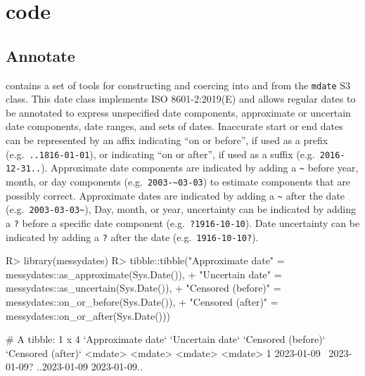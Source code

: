 \documentclass[
]{jss}
\begin{document}
\section[R code]{ code}\label{r-code}

\hypertarget{annotate}{%
\subsection{Annotate}\label{annotate}}

 contains a set of tools for constructing and coercing
into and from the \texttt{mdate} S3 class. This date class implements
ISO 8601-2:2019(E) and allows regular dates to be annotated to express
unspecified date components, approximate or uncertain date components,
date ranges, and sets of dates. Inaccurate start or end dates can be
represented by an affix indicating ``on or before'', if used as a prefix
(e.g.~\texttt{..1816-01-01}), or indicating ``on or after'', if used as
a suffix (e.g.~\texttt{2016-12-31..}). Approximate date components are
indicated by adding a \texttt{\textasciitilde{}} before year, month, or
day components (e.g.~\texttt{2003-\textasciitilde{}03-03}) to estimate
components that are possibly correct. Approximate dates are indicated by
adding a \texttt{\textasciitilde{}} after the date
(e.g.~\texttt{2003-03-03\textasciitilde{}}), Day, month, or year,
uncertainty can be indicated by adding a \texttt{?} before a specific
date component (e.g.~\texttt{?1916-10-10}). Date uncertainty can be
indicated by adding a \texttt{?} after the date
(e.g.~\texttt{1916-10-10?}).

\begin{CodeChunk}
\begin{CodeInput}
R> library(messydates)
R> tibble::tibble("Approximate date" = messydates::as_approximate(Sys.Date()), 
+                "Uncertain date" = messydates::as_uncertain(Sys.Date()),
+                "Censored (before)" = messydates::on_or_before(Sys.Date()),
+                "Censored (after)" = messydates::on_or_after(Sys.Date()))
\end{CodeInput}
\begin{CodeOutput}
# A tibble: 1 x 4
  `Approximate date` `Uncertain date` `Censored (before)` `Censored (after)`
  <mdate>            <mdate>          <mdate>             <mdate>           
1 2023-01-09~        2023-01-09?      ..2023-01-09        2023-01-09..      
\end{CodeOutput}
\end{CodeChunk}
\end{document}
